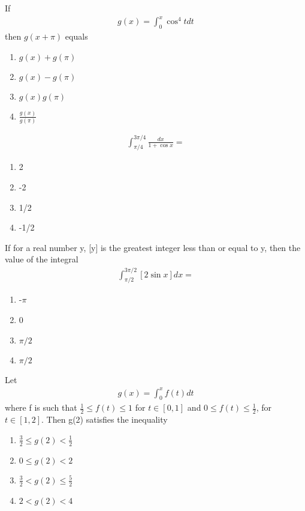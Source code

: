 \item If 
\begin{align*}
g(x) = \int_{0}^{x}\cos^{4}t dt
\end{align*}
then $g(x + \pi)$ equals
\begin{enumerate}
\item $g(x) + g(\pi)$
\item $g(x) - g(\pi)$
\item $g(x)g(\pi)$
\item $\frac{g(x)}{g(\pi)}$
\end{enumerate}

\item
\begin{align*}
\int_{\pi/4}^{3\pi/4}\frac{dx}{1 + \cos x} = 
\end{align*}
\begin{enumerate}
\item 2
\item -2
\item 1/2
\item -1/2
\end{enumerate}

\item If for a real number y, [y] is the greatest integer less than or equal to y, then the value of the integral
\begin{align*}
\int_{\pi/2}^{3\pi/2}[2\sin x]dx = 
\end{align*}
\begin{enumerate}
\item -$\pi$
\item 0
\item $\pi/2$
\item $\pi/2$
\end{enumerate}

\item Let
\begin{align*}
g(x) = \int_{0}^{x}f(t) dt
\end{align*}
where f is such that $\frac{1}{2} \leq f(t) \leq 1$ for $t \in [0, 1]$ and $0 \leq f(t) \leq \frac{1}{2}$, for $t \in [1, 2]$. Then g(2) satisfies the inequality
\begin{enumerate}
\item $\frac{3}{2} \leq g(2) < \frac{1}{2}$
\item $0 \leq g(2) < 2$
\item $\frac{3}{2} < g(2) \leq \frac{5}{2}$
\item $2 < g(2) < 4$
\end{enumerate}

